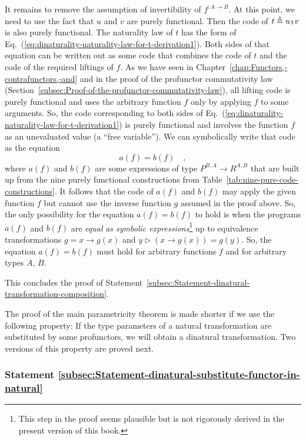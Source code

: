 It remains to remove the assumption of invertibility of $f^{:A\rightarrow B}$.
At this point, we need to use the fact that $u$ and $v$ are purely
functional. Then the code of $t\triangleq u\bef v$ is also purely
functional. The naturality law of $t$ has the form of Eq.~(\ref{eq:dinaturality-naturality-law-for-t-derivation1}).
Both sides of that equation can be written out as some code that combines
the code of $t$ and the code of the required liftings of $f$. As
we have seen in Chapter~\ref{chap:Functors,-contrafunctors,-and}
and in the proof of the profunctor commutativity law (Section~\ref{subsec:Proof-of-the-profunctor-commutativity-law}),
all lifting code is purely functional and uses the arbitrary function
$f$ only by applying $f$ to some arguments. So, the code corresponding
to both sides of Eq.~(\ref{eq:dinaturality-naturality-law-for-t-derivation1})
is purely functional and involves the function $f$ as an unevaluated
value (a \textsf{``}free variable\textsf{''}). We can symbolically
write that code as the equation 
\[
a(f)=b(f)\quad,
\]
where $a(f)$ and $b(f)$ are some expressions of type $P^{B,A}\rightarrow R^{A,B}$
that are built up from the nine purely functional constructions from
Table~\ref{tab:nine-pure-code-constructions}. It follows that the
code of $a(f)$ and $b(f)$ may apply the given function $f$ but
cannot use the inverse function $g$ assumed in the proof above. So,
the only possibility for the equation $a(f)=b(f)$ to hold is when
the programs $a(f)$ and $b(f)$ are \emph{equal} \emph{as symbolic
expressions}\footnote{This step in the proof seems plausible but is not rigorously derived
in the present version of this book.} up to equivalence transformations $g=x\rightarrow g(x)$ and $y\triangleright(x\rightarrow g(x))=g(y)$.
So, the equation $a(f)=b(f)$ must hold for arbitrary functions $f$
and for arbitrary types $A$, $B$. 

This concludes the proof of Statement~\ref{subsec:Statement-dinatural-transformation-composition}.

The proof of the main parametricity theorem is made shorter if we
use the following property: If the type parameters of a natural transformation
are substituted by some profunctors, we will obtain a dinatural transformation.
Two versions of this property are proved next.

\subsubsection{Statement \label{subsec:Statement-dinatural-substitute-functor-in-natural}\ref{subsec:Statement-dinatural-substitute-functor-in-natural}}


